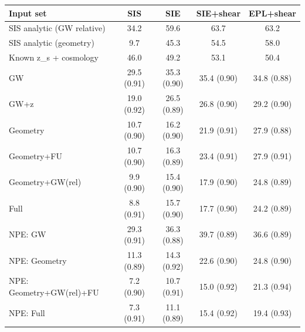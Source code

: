 \begin{tabular*}{\linewidth}{@{\extracolsep{\fill}}lcccc@{}}
\toprule
Input set & SIS & SIE & SIE+shear & EPL+shear \\
\midrule
SIS analytic (GW relative) & 34.2 & 59.6 & 63.7 & 63.2 \\
SIS analytic (geometry) & 9.7 & 45.3 & 54.5 & 58.0 \\
Known z\_s + cosmology & 46.0 & 49.2 & 53.1 & 50.4 \\
\midrule
GW & 29.5 (0.91) & 35.3 (0.90) & 35.4 (0.90) & 34.8 (0.88) \\
GW+z & 19.0 (0.92) & 26.5 (0.89) & 26.8 (0.90) & 29.2 (0.90) \\
Geometry & 10.7 (0.90) & 16.2 (0.90) & 21.9 (0.91) & 27.9 (0.88) \\
Geometry+FU & 10.7 (0.90) & 16.3 (0.89) & 23.4 (0.91) & 27.9 (0.91) \\
Geometry+GW(rel) & 9.9 (0.90) & 15.4 (0.90) & 17.9 (0.90) & 24.8 (0.89) \\
Full & 8.8 (0.91) & 15.7 (0.90) & 17.7 (0.90) & 24.2 (0.89) \\
\midrule
NPE: GW & 29.3 (0.91) & 36.3 (0.88) & 39.7 (0.89) & 36.6 (0.89) \\
NPE: Geometry & 11.3 (0.89) & 14.3 (0.92) & 22.6 (0.90) & 24.8 (0.90) \\
NPE: Geometry+GW(rel)+FU & 7.2 (0.90) & 10.7 (0.91) & 15.0 (0.92) & 21.3 (0.94) \\
NPE: Full & 7.3 (0.91) & 11.1 (0.89) & 15.4 (0.92) & 19.4 (0.93) \\
\bottomrule
\end{tabular*}
